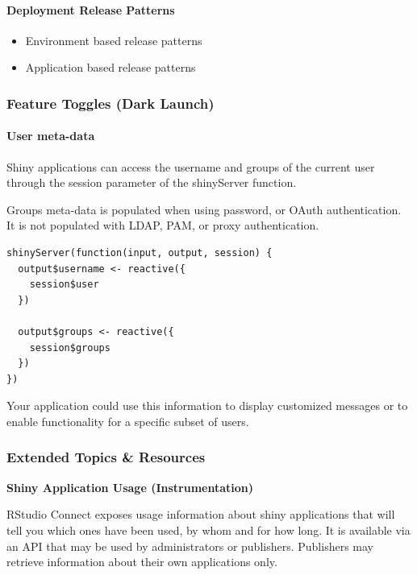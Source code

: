 \documentclass[]{book}
\providecommand{\tightlist}{%
  \setlength{\itemsep}{0pt}\setlength{\parskip}{0pt}}
\let\oldparagraph\paragraph
\renewcommand{\paragraph}[1]{\oldparagraph{#1}\mbox{}}
\theoremstyle{definition}
\theoremstyle{definition}
\theoremstyle{definition}
\theoremstyle{remark}
\begin{document}
\hypertarget{deployment-release-patterns}{%
\paragraph{Deployment Release
Patterns}\label{deployment-release-patterns}}

\begin{itemize}
\tightlist
\item
  Environment based release patterns
\item
  Application based release patterns
\end{itemize}

\hypertarget{feature-toggles-dark-launch}{%
\subsubsection{Feature Toggles (Dark
Launch)}\label{feature-toggles-dark-launch}}

\hypertarget{user-meta-data}{%
\paragraph{User meta-data}\label{user-meta-data}}

Shiny applications can access the username and groups of the current
user through the session parameter of the shinyServer function.

Groups meta-data is populated when using password, or OAuth
authentication. It is not populated with LDAP, PAM, or proxy
authentication.

\begin{verbatim}
shinyServer(function(input, output, session) {
  output$username <- reactive({
    session$user
  })
  
  output$groups <- reactive({
    session$groups
  })
})
\end{verbatim}

Your application could use this information to display customized
messages or to enable functionality for a specific subset of users.

\hypertarget{extended-topics-resources}{%
\subsubsection{Extended Topics \&
Resources}\label{extended-topics-resources}}

\textbf{Shiny Application Usage (Instrumentation)}

RStudio Connect exposes usage information about shiny applications that
will tell you which ones have been used, by whom and for how long. It is
available via an API that may be used by administrators or publishers.
Publishers may retrieve information about their own applications only.
\end{document}
